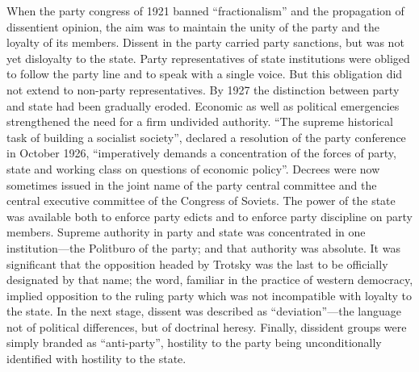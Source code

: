 When the party congress of 1921 banned ``fractionalism'' and the propagation of dissentient opinion, the aim was to maintain the unity of the party and the loyalty of its members. Dissent in the party carried party sanctions, but was not yet disloyalty to the state. Party representatives of state institutions were obliged to follow the party line and to speak with a single voice. But this obligation did not extend to non-party representatives. By 1927 the distinction between party and state had been gradually eroded. Economic as well as political emergencies strengthened the need for a firm undivided authority. ``The supreme historical task of building a socialist society'', declared a resolution of the party conference in October 1926, ``imperatively demands a concentration of the forces of party, state and working class on questions of economic policy''. Decrees were now sometimes issued in the joint name of the party central committee and the central executive committee of the Congress of Soviets. The power of the state was available both to enforce party edicts and to enforce party discipline on party members. Supreme authority in party and state was concentrated in one institution---the Politburo of the party; and that authority was absolute. It was significant that the opposition headed by Trotsky was the last to be officially designated by that name; the word, familiar in the practice of western democracy, implied opposition to the ruling party which was not incompatible with loyalty to the state. In the next stage, dissent was described as ``deviation''---the language not of political differences, but of doctrinal heresy. Finally, dissident groups were simply branded as ``anti-party'', hostility to the party being unconditionally identified with hostility to the state. 

